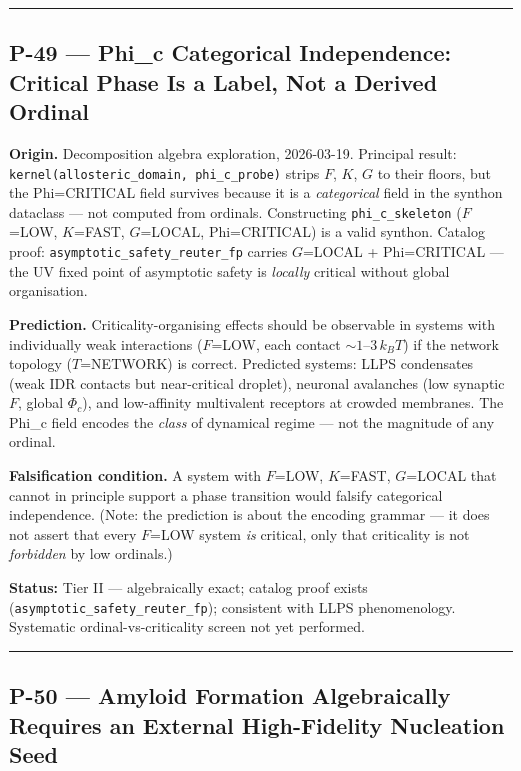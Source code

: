 \documentclass[12pt,a4paper]{article}
\begin{document}
\begin{center}
\rule{0.5\textwidth}{0.4pt}
\end{center}

\subsection{P-49 --- Phi\_c Categorical Independence: Critical Phase Is a Label, Not a Derived Ordinal}

\textbf{Origin.} Decomposition algebra exploration, 2026-03-19. Principal result: \texttt{kernel(allosteric\_domain, phi\_c\_probe)} strips $F$, $K$, $G$ to their floors, but the Phi=CRITICAL field survives because it is a \emph{categorical} field in the synthon dataclass --- not computed from ordinals. Constructing \texttt{phi\_c\_skeleton} ($F$=LOW, $K$=FAST, $G$=LOCAL, Phi=CRITICAL) is a valid synthon. Catalog proof: \texttt{asymptotic\_safety\_reuter\_fp} carries $G$=LOCAL + Phi=CRITICAL --- the UV fixed point of asymptotic safety is \emph{locally} critical without global organisation.

\textbf{Prediction.} Criticality-organising effects should be observable in systems with individually weak interactions ($F$=LOW, each contact $\sim 1$--$3\,k_BT$) if the network topology ($T$=NETWORK) is correct. Predicted systems: LLPS condensates (weak IDR contacts but near-critical droplet), neuronal avalanches (low synaptic $F$, global $\Phi_c$), and low-affinity multivalent receptors at crowded membranes. The Phi\_c field encodes the \emph{class} of dynamical regime --- not the magnitude of any ordinal.

\textbf{Falsification condition.} A system with $F$=LOW, $K$=FAST, $G$=LOCAL that cannot in principle support a phase transition would falsify categorical independence. (Note: the prediction is about the encoding grammar --- it does not assert that every $F$=LOW system \emph{is} critical, only that criticality is not \emph{forbidden} by low ordinals.)

\textbf{Status:} Tier II --- algebraically exact; catalog proof exists (\texttt{asymptotic\_safety\_reuter\_fp}); consistent with LLPS phenomenology. Systematic ordinal-vs-criticality screen not yet performed.

\begin{center}
\rule{0.5\textwidth}{0.4pt}
\end{center}

\subsection{P-50 --- Amyloid Formation Algebraically Requires an External High-Fidelity Nucleation Seed}
\end{document}
